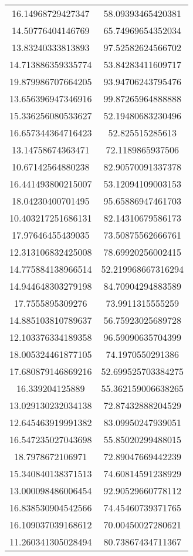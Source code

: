 \begin{table}
\begin{tabular}{cc}
16.14968729427347 & 58.09393465420381 \\
14.50776404146769 & 65.74969654352034 \\
13.83240333813893 & 97.52582624566702 \\
14.713886359335774 & 53.84283411609717 \\
19.879986707664205 & 93.94706243795476 \\
13.656396947346916 & 99.87265964888888 \\
15.336256080533627 & 52.19480683230496 \\
16.657344364716423 & 52.825515285613 \\
13.14758674363471 & 72.1189865937506 \\
10.67142564880238 & 82.90570091337378 \\
16.441493800215007 & 53.12094109003153 \\
18.04230400701495 & 95.65886947461703 \\
10.403217251686131 & 82.14310679586173 \\
17.97646455439035 & 73.50875562666761 \\
12.313106832425008 & 78.69920256002415 \\
14.775884138966514 & 52.219968667316294 \\
14.944648303279198 & 84.70904294883589 \\
17.7555895309276 & 73.9911315555259 \\
14.885103810789637 & 56.75923025689728 \\
12.103376334189358 & 96.59090635704399 \\
18.005324461877105 & 74.1970550291386 \\
17.680879146869216 & 52.699525703384275 \\
16.339204125889 & 55.362159006638265 \\
13.029130232034138 & 72.87432888204529 \\
12.645463919991382 & 83.09950247939051 \\
16.547235027043698 & 55.85020299488015 \\
18.7978672106971 & 72.89047669442239 \\
15.340840138371513 & 74.60814591238929 \\
13.000098486006454 & 92.90529660778112 \\
16.838530904542566 & 74.45460739371765 \\
16.109037039168612 & 70.00450027280621 \\
11.260341305028494 & 80.73867434711367 \\

\end{tabular}
\end{table}
